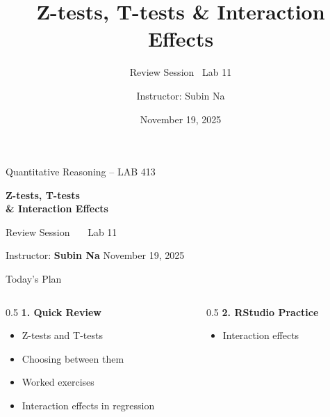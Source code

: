 \documentclass[aspectratio=169,11pt]{beamer}
\title{\bfseries Z-tests, T-tests \& Interaction Effects}
\subtitle{Review Session \textbullet\ Lab 11}
\author{Instructor: Subin Na}
\institute{Quantitative Reasoning -- LAB 413}
\date{November 19, 2025}
\begin{document}
{
\begin{frame}
  \vfill
  {\color{qrgray}\small Quantitative Reasoning -- LAB 413}\\[0.6em]
  {\color{qrnavy}\huge\bfseries Z-tests, T-tests\\[0.15em]\& Interaction Effects\par}
  \vspace{0.4em}
  {\color{qrblue}\large Review Session \ \textbullet\ \ Lab 11}\par
  \vspace{1.6em}
  {\color{qrgray} Instructor: \textbf{Subin Na} \hfill November 19, 2025}
  \vfill
\end{frame}
}

\begin{frame}{Today's Plan}
  \begin{columns}[T]
    \begin{column}{0.5\textwidth}
      \textbf{\color{qrnavy}1. Quick Review}
      \begin{itemize}
        \item Z-tests and T-tests
        \item Choosing between them
        \item Worked exercises
        \item Interaction effects in regression
      \end{itemize}
    \end{column}
    \begin{column}{0.5\textwidth}
      \vspace{0.8em}
      \textbf{\color{qrnavy}2. RStudio Practice}
      \begin{itemize}
        \item Interaction effects
      \end{itemize}
    \end{column}
  \end{columns}
\end{frame}
\end{document}
